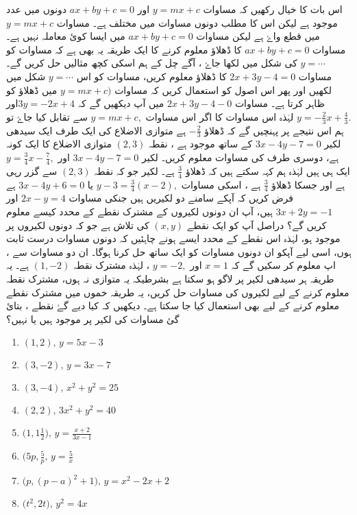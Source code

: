 اس بات کا خیال رکھیں کہ مساوات  \( y=mx+c \) اور \( ax+by+c=0 \) دونوں میں عدد   موجود ہے لیکن اس کا مطلب دونوں مساوات میں مختلف ہے۔ مساوات \( y=mx+c \) میں   قطع واۓ ہے لیکن مساوات \( ax+by+c=0 \) میں ایسا کوئ معاملہ نہیں ہے۔
مساوات \( ax+by+c=0 \) کا ڈھلاؤ معلوم کرنے کا ایک طریقہ یہ بھی ہے کہ مساوات کو  \( y= \cdots \) کی شکل میں لکھا جاۓ ، آگے چل کے ہم اسکی کچھ مثالیں حل کریں گے۔
مساوات \( 2x+3y-4=0 \) کا ڈھلاؤ معلوم کریں،
مساوات کو اس \( y= \cdots \) شکل میں لکھیں اور پھر اس اصول کو استعمال کریں کہ مساوات \( y=mx+c) \) میں  ڈھلاؤ کو ظاہر کرتا ہے۔ 
مساوات \(  2x+3y-4-0 \) میں آپ دیکھیں گے کہ \( 3y = -2x +4 \)اور\( y= - \frac{2}{3} x + \frac{4}{3}. \) لہٰذہ اس مساوات کا اگر  اس مساوات \( y=mx+c ,\) سے تقابل کیا جاۓ تو ہم اس نتیجے پر پہنچیں گے کہ ڈھلاؤ  \(- \frac{2}{3} \) ہے
متوازی الاضلاع کی ایک طرف ایک سیدھی لکیر \( 3x -4y -7 = 0 \) کے ساتھ موجود ہے ، نقطہ \( (2,3) \) متوازی الاضلاع کا ایک کونہ ہے، دوسری طرف کی مساوات معلوم کریں۔
لکیر \( 3x-4y-7=0 \) اور \( y= \frac{3}{4}x - \frac{7}{4} , \) ایک ہی ہیں لہٰذہ ہم کہہ سکتے ہیں کہ ڈھلاؤ \( \frac{3}{4}\) ہے۔ لکیر جو کہ نقطہ \( (2,3) \) سے گزر رہی ہے اور جسکا ڈھلاؤ \( \frac{3}{4}\) ہے ، اسکی مساوات \( y-3=\frac{3}{4} (x-2) , \) یا \( 3x-4y+6=0 \) ہے
فرض کریں کہ آپکے سامنے دو لکیریں ہیں جنکی مساوات \( 2x-y=4  \) اور \(  3x+2y=-1\) ہیں، آپ ان دونوں لکیروں کے مشترک نقطے کے محدد کیسے معلوم کریں گے؟
دراصل آپ کو ایک نقطے \(  (x,y)    \) کی تلاش ہے جو کہ دونوں لکیروں پر موجود ہو، لہٰذہ اس نقطے کے محدد ایسے ہونے چاہئیں کہ دونوں مساوات درست  ثابت ہوں، اسی لیے آپکو ان دونوں مساوات کو ایک ساتھ حل کرنا ہوگا۔
ان دو مساوات سے ، اپ معلوم کر سکیں گے کہ \( x=1\) اور \( y=-2, \) ، لہٰذہ مشترک نقطہ \( (1,-2) \) ہے۔ 
یہ طریقہ ہر سیدھی لکیر پر لاگو ہو سکتا ہے بشرطیکہ یہ متوازی نہ ہوں، مشترک نقطہ معلوم کرنے کے لیے لکیروں کی مساوات حل کریں، یہ طریقہ خموں میں مشترک نقطے معلوم کرنے کے لیے بھی استعمال کیا جا سکتا ہے۔ 
دیکھیں کہ کیا دیے گۓ نقطے ، بتائ گئ مساوات کی لکیر پر موجود ہیں یا نہیں؟
\begin{multicols}{2}
   \begin{enumerate}[.a]
\item \( (1,2),\,y=5x-3 \)
\item \( (3,-2),\,y=3x-7 \)
\item \( (3,-4),\,x^2 + y^2 = 25 \)
\item \( (2,2),\,3x^2 + y^2 = 40 \)
\item \( \big(1,1\frac{1}{2} \big),\,y=\frac{x+2}{3x-1} \)
\item \( \big( 5p, \frac{5}{p},\,y=\frac{5}{x} \)
\item \( \big(p,(p-a)^2 +1 \big),\,y=x^2 -2x +2 \)
\item \( \big( t^2, 2t \big),\,y^2 = 4x \)
\end{enumerate}
\end{multicols}
